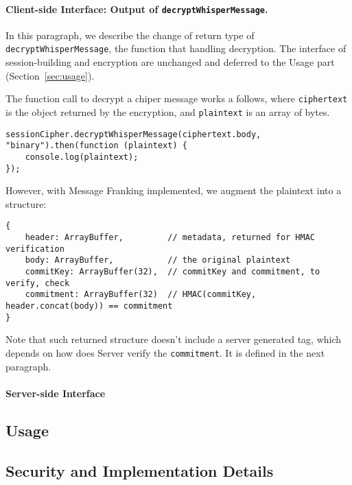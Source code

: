 \documentclass{article}
\begin{document}
\paragraph{Client-side Interface: Output of {\tt decryptWhisperMessage}.}
In this paragraph, 
we describe the change of return type of {\tt decryptWhisperMessage},
the function that handling decryption.
The interface of session-building and encryption are unchanged
and deferred to the Usage part (Section~\ref{sec:usage}).

The function call to decrypt a chiper message works a follows,
where {\tt ciphertext} is the object returned by the encryption,
and {\tt plaintext} is an array of bytes.
{\small
\begin{verbatim}
sessionCipher.decryptWhisperMessage(ciphertext.body, "binary").then(function (plaintext) {
    console.log(plaintext);
});
\end{verbatim}
}
However, with Message Franking implemented,
we augment the plaintext into a structure:
{\small
\begin{verbatim}
{
    header: ArrayBuffer,         // metadata, returned for HMAC verification
    body: ArrayBuffer,           // the original plaintext
    commitKey: ArrayBuffer(32),  // commitKey and commitment, to verify, check
    commitment: ArrayBuffer(32)  // HMAC(commitKey, header.concat(body)) == commitment
}
\end{verbatim}
}
Note that such returned structure doesn't include a server generated tag,
which depends on how does Server verify the {\tt commitment}.
It is defined in the next paragraph.

\paragraph{Server-side Interface}



\subsection{Usage}



\subsection{Security and Implementation Details}















\end{document}
